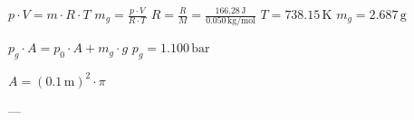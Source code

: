\( p \cdot V = m \cdot R \cdot T \)  
\( m_g = \frac{p \cdot V}{R \cdot T} \)  
\( R = \frac{R}{M} = \frac{166.28 \, \text{J}}{0.050 \, \text{kg/mol}} \)  
\( T = 738.15 \, \text{K} \)  
\( m_g = 2.687 \, \text{g} \)  

\( p_g \cdot A = p_0 \cdot A + m_g \cdot g \)  
\( p_g = 1.100 \, \text{bar} \)  

\( A = (0.1 \, \text{m})^2 \cdot \pi \)  

---